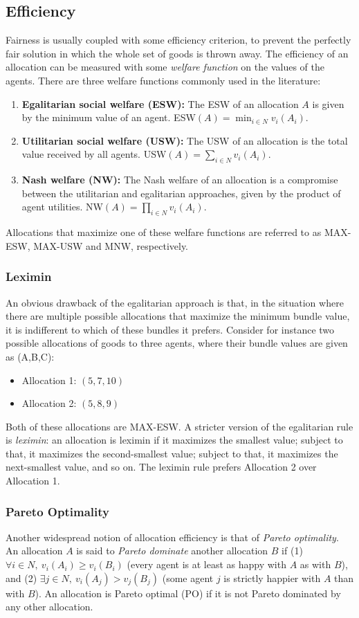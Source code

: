 \subsection{Efficiency}
Fairness is usually coupled with some efficiency criterion, to prevent the perfectly fair solution in which the whole set of goods is thrown away. The efficiency of an allocation can be measured with some \textit{welfare function} on the values of the agents. There are three welfare functions commonly used in the literature:
\begin{enumerate}
  \item \textbf{Egalitarian social welfare (ESW):} The ESW of an allocation $A$ is given by the minimum value of an agent. ESW$(A) = \min_{i\in N}v_i(A_i)$.
  \item \textbf{Utilitarian social welfare (USW):} The USW of an allocation is the total value received by all agents. USW$(A) = \sum_{i\in N}v_i(A_i)$.
  \item \textbf{Nash welfare (NW):} The Nash welfare of an allocation is a compromise between the utilitarian and egalitarian approaches, given by the product of agent utilities. NW$(A) = \prod_{i\in N}v_i(A_i)$.
\end{enumerate}
Allocations that maximize one of these welfare functions are referred to as MAX-ESW, MAX-USW and MNW, respectively. 

\subsubsection*{Leximin}
An obvious drawback of the egalitarian approach is that, in the situation where there are multiple possible allocations that maximize the minimum bundle value, it is indifferent to which of these bundles it prefers. Consider for instance two possible allocations of goods to three agents, where their bundle values are given as (A,B,C):
\begin{itemize}
  \item Allocation 1: $(5,7,10)$
  \item Allocation 2: $(5,8,9)$
\end{itemize}
Both of these allocations are MAX-ESW. A stricter version of the egalitarian rule is \textit{leximin}: an allocation is leximin if it maximizes the smallest value; subject to that, it maximizes the second-smallest value; subject to that, it maximizes the next-smallest value, and so on. The leximin rule prefers Allocation 2 over Allocation 1.

\subsubsection*{Pareto Optimality}
Another widespread notion of allocation efficiency is that of \textit{Pareto optimality}. An allocation $A$ is said to \textit{Pareto dominate} another allocation $B$ if (1) $\forall i\in N,\ v_i(A_i) \geq v_i(B_i)$ (every agent is at least as happy with $A$ as with $B$), and (2) $\exists j\in N,\ v_i(A_j) > v_j(B_j)$ (some agent $j$ is strictly happier with $A$ than with $B$). An allocation is Pareto optimal (PO) if it is not Pareto dominated by any other allocation.

